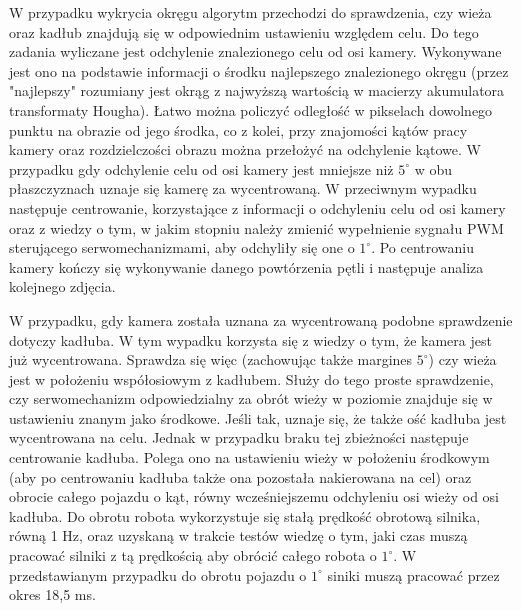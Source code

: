 W przypadku wykrycia okręgu algorytm przechodzi do sprawdzenia, czy wieża oraz kadłub znajdują się w odpowiednim ustawieniu względem celu. Do tego zadania wyliczane jest odchylenie znalezionego celu od osi kamery. Wykonywane jest ono na podstawie informacji o środku najlepszego znalezionego okręgu (przez "najlepszy" rozumiany jest okrąg z najwyższą wartością w macierzy akumulatora transformaty Hougha). Łatwo można policzyć odległość w pikselach dowolnego punktu na obrazie od jego środka, co z kolei, przy znajomości kątów pracy kamery oraz rozdzielczości obrazu można przełożyć na odchylenie kątowe. W przypadku gdy odchylenie celu od osi kamery jest mniejsze niż $5^\circ$ w obu płaszczyznach uznaje się kamerę za wycentrowaną. W przeciwnym wypadku następuje centrowanie, korzystające z informacji o odchyleniu celu od osi kamery oraz z wiedzy o tym, w jakim stopniu należy zmienić wypełnienie sygnału PWM sterującego serwomechanizmami, aby odchyliły się one o $1^\circ$. Po centrowaniu kamery kończy się wykonywanie danego powtórzenia pętli i następuje analiza kolejnego zdjęcia.

W przypadku, gdy kamera została uznana za wycentrowaną podobne sprawdzenie dotyczy kadłuba. W tym wypadku korzysta się z wiedzy o tym, że kamera jest już wycentrowana. Sprawdza się więc (zachowując także margines $5^\circ$) czy wieża jest w położeniu współosiowym z kadłubem. Służy do tego proste sprawdzenie, czy serwomechanizm odpowiedzialny za obrót wieży w poziomie znajduje się w ustawieniu znanym jako środkowe. Jeśli tak, uznaje się, że także ość kadłuba jest wycentrowana na celu. Jednak w przypadku braku tej zbieżności następuje centrowanie kadłuba. Polega ono na ustawieniu wieży w położeniu środkowym (aby po centrowaniu kadłuba także ona pozostała nakierowana na cel) oraz obrocie całego pojazdu o kąt, równy wcześniejszemu odchyleniu osi wieży od osi kadłuba. Do obrotu robota wykorzystuje się stałą prędkość obrotową silnika, równą 1 Hz, oraz uzyskaną w trakcie testów wiedzę o tym, jaki czas muszą pracować silniki z tą prędkością aby obrócić całego robota o $1^\circ$. W przedstawianym przypadku do obrotu pojazdu o $1^\circ$ siniki muszą pracować przez okres 18,5 ms.

